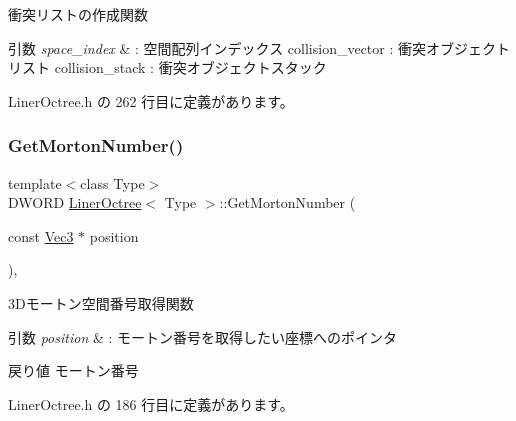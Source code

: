 衝突リストの作成関数 


\begin{DoxyParams}{引数}
{\em space\+\_\+index} & \+: 空間配列インデックス collision\+\_\+vector \+: 衝突オブジェクトリスト collision\+\_\+stack \+: 衝突オブジェクトスタック \\
\hline
\end{DoxyParams}


 Liner\+Octree.\+h の 262 行目に定義があります。

\mbox{\label{class_liner_octree_ad931e5f3ae94cd4337dd96d133ee42a8}} 
\subsubsection{\texorpdfstring{Get\+Morton\+Number()}{GetMortonNumber()}}
{\footnotesize\ttfamily template$<$class Type$>$ \\
D\+W\+O\+RD \mbox{\hyperlink{class_liner_octree}{Liner\+Octree}}$<$ Type $>$\+::Get\+Morton\+Number (\begin{DoxyParamCaption}\item[{const \mbox{\hyperlink{_vector3_d_8h_ab16f59e4393f29a01ec8b9bbbabbe65d}{Vec3}} $\ast$}]{position }\end{DoxyParamCaption})\hspace{0.3cm}{\ttfamily [inline]}, {\ttfamily [private]}}



3\+Dモートン空間番号取得関数 


\begin{DoxyParams}{引数}
{\em position} & \+: モートン番号を取得したい座標へのポインタ \\
\hline
\end{DoxyParams}
\begin{DoxyReturn}{戻り値}
モートン番号 
\end{DoxyReturn}


 Liner\+Octree.\+h の 186 行目に定義があります。

\mbox{\label{class_liner_octree_a715d655c722c00c002d0bb006d0600d8}} 

